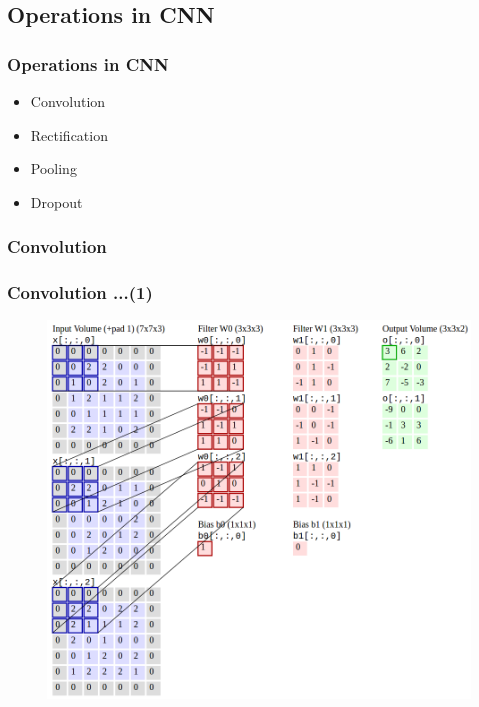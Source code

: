 \documentclass{beamer}
\begin{document}
\subsection{Operations in CNN}
\begin{frame}
	\frametitle{Operations in CNN}
	\begin{itemize}
		\item Convolution
		\item Rectification
		\item Pooling
		\item Dropout
	\end{itemize}
\end{frame}

\subsubsection{Convolution}

\begin{frame}
	\frametitle{Convolution ...(1)}
	\begin{figure}
		\includegraphics[scale=0.28]{./figures/edit/conv_03_edit.png}
	\end{figure}
\end{frame}
\end{document}
